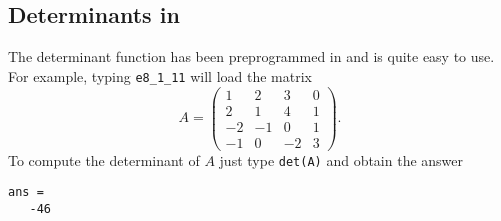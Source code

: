 \documentclass{ximera}
\begin{document}
\subsection*{Determinants in \Matlab}

The determinant function has been preprogrammed in \Matlab and
is quite easy to use.  For example, typing {\tt e8\_1\_11} will
load the matrix
\begin{equation*}  \label{e:A4x4}
A = \left(\begin{array}{rrrr}
     1   &  2  &   3  &   0\\
     2   &  1  &   4  &   1\\
    -2   & -1  &   0  &   1\\
    -1   &  0  &  -2  &   3  \end{array} \right).
\end{equation*}
To compute the determinant of $A$ just type {\tt det(A)} and
obtain the answer 
\begin{verbatim}
ans =
   -46
\end{verbatim}
\end{document}

